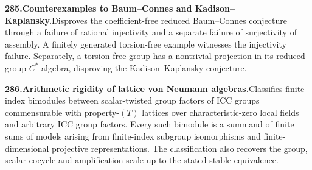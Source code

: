 \documentclass[11pt,a4paper]{article}
\begin{document}
  \par \begin{minipage}{\linewidth}
  \fontsize{10.5}{12.6}\selectfont\RaggedRight
  \hypertarget{result 285}{}
  {\bfseries\textcolor{muted}{285.}\enspace Counterexamples to Baum--Connes and Kadison--Kaplansky.}\enspace Disproves the coefficient-free reduced Baum--Connes conjecture through a failure of rational injectivity and a separate failure of surjectivity of assembly. A finitely generated torsion-free example witnesses the injectivity failure. Separately, a torsion-free group has a nontrivial projection in its reduced group $C^*$-algebra, disproving the Kadison--Kaplansky conjecture.\par
  \end{minipage}\par\vspace{5pt}



  \par \begin{minipage}{\linewidth}
  \fontsize{10.5}{12.6}\selectfont\RaggedRight
  \hypertarget{result 286}{}
  {\bfseries\textcolor{muted}{286.}\enspace Arithmetic rigidity of lattice von Neumann algebras.}\enspace Classifies finite-index bimodules between scalar-twisted group factors of ICC groups commensurable with property-$(T)$ lattices over characteristic-zero local fields and arbitrary ICC group factors. Every such bimodule is a summand of finite sums of models arising from finite-index subgroup isomorphisms and finite-dimensional projective representations. The classification also recovers the group, scalar cocycle and amplification scale up to the stated stable equivalence.\par
  \end{minipage}\par\vspace{5pt}
\end{document}
